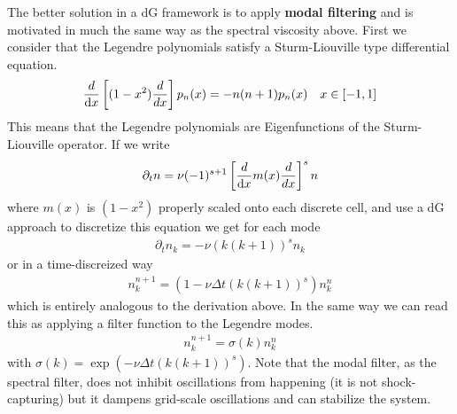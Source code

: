 The better solution in a dG framework is to apply \textbf{modal filtering} and is motivated in much the same
way as the spectral viscosity above.
First we consider that the Legendre polynomials satisfy a Sturm-Liouville type differential equation.
\begin{align}
    \frac{d}{\mathrm{d} x} \left[ (1-x^2) \frac{ d }{d x} \right]p_n(x) = -n(n+1) p_n(x) \quad x \in [-1,1]
\end{align}
This means that the Legendre polynomials are Eigenfunctions of the Sturm-Liouville operator. If we write
\begin{align}
    \partial_t n = \nu (-1)^{s+1}\left[\frac{d}{\mathrm{d} x}  m(x) \frac{ d }{d x} \right]^s  n
\end{align}
where $m(x)$ is $(1-x^2)$ properly scaled onto each discrete cell, and use a dG approach to discretize this equation we get for each mode
\begin{align}
    \partial_t n_k = -\nu (k(k+1))^s  n_k
\end{align}
or in a time-discreized way
\begin{align}
    n_k^{n+1} = (1-\nu \Delta t (k(k+1))^s ) n_k^n
\end{align}
which is entirely analogous to the derivation above.
In the same way we can read this as applying a filter function to the Legendre modes.
\begin{align}
    n_k^{n+1} = \sigma(k) n_k^n
\end{align}
with $\sigma(k) = \exp( - \nu \Delta t (k(k+1))^s)$.
Note that the modal filter, as the spectral filter, does not inhibit oscillations from happening (it is not shock-capturing) but it dampens grid-scale oscillations
and can stabilize the system.



